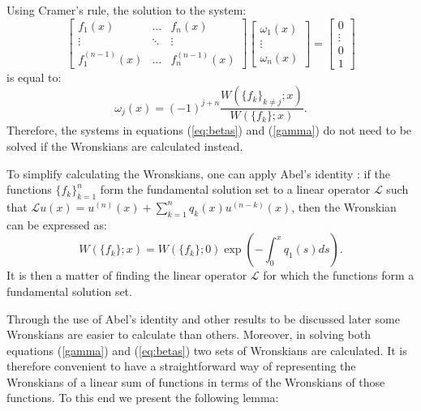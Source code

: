 \documentclass{article}
\begin{document}
Using Cramer's rule, the solution to the system:
\begin{equation}
\begin{bmatrix} f_1(x) & \dots & f_n(x) \\ \vdots & \ddots & \vdots \\ f^{(n-1)}_1(x) & \dots & f_n^{(n-1)}(x) \end{bmatrix} 
\begin{bmatrix} \omega_1(x) \\ \vdots \\ \omega_n(x) \end{bmatrix} =
\begin{bmatrix} 0 \\ \vdots \\ 0 \\ 1 \end{bmatrix}
\end{equation}
is equal to:
\begin{equation} \label{eq:Wronskian coeffs}
\omega_j(x) = (-1)^{j+n} \frac{ W( \{ f_k \}_{k \neq j} ; x) }{ W( \{ f_k \} ; x ) } .
\end{equation}
Therefore, the systems in equations (\ref{eq:betas}) and (\ref{gamma}) do not need to be solved if the Wronskians are calculated instead.


To simplify calculating the Wronskians, one can apply Abel's identity \cite{Abel, BoyceDiPrima}:
if the functions $\{ f_k \}_{k=1}^n$ form the fundamental solution set to a linear operator $\mathcal{L}$ such that 
$\mathcal{L} u(x) = u^{(n)}(x) + \sum_{k=1}^n q_k(x) u^{(n - k)}(x)$, then the Wronskian can be expressed as:
\begin{equation}
W(\{f_k\}; x) = W(\{f_k\}; 0) \exp \left ({ - \int_{0}^x q_1(s) ds } \right ).
\end{equation}
It is then a matter of finding the linear operator $\mathcal{L}$ for which the functions form a fundamental solution set.

Through the use of Abel's identity and other results to be discussed later some Wronskians are easier to calculate than others.
Moreover, in solving both equations (\ref{gamma}) and (\ref{eq:betas}) two sets of Wronskians are calculated.
It is therefore convenient to have a straightforward way of representing the Wronskians of a linear sum of functions in terms of the Wronskians of those functions.
To this end we present the following lemma:
\end{document}
